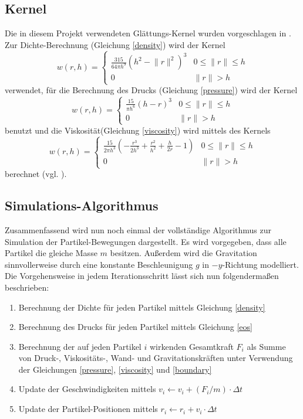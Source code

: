 \subsection*{Kernel}
Die in diesem Projekt verwendeten Glättungs-Kernel wurden vorgeschlagen in \cite{FluidSim}. Zur Dichte-Berechnung (Gleichung \ref{density}) wird der Kernel
\[
w(r,h) = \begin{cases}
\frac{315}{64\pi h^9} (h^2 - \lVert r \rVert^2)^3 & 0\leq \lVert r \rVert\leq h\\
0 & \lVert r \rVert > h
\end{cases}
\]
verwendet, für die Berechnung des Drucks (Gleichung \ref{pressure}) wird der Kernel
\[
w(r,h) = \begin{cases}
\frac{15}{\pi h^6} (h-r)^3 & 0\leq \lVert r \rVert\leq h\\
0 & \lVert r \rVert > h
\end{cases}
\]
benutzt und die Viskosität(Gleichung \ref{viscosity}) wird mittels des Kernels
\[
w(r,h) = \begin{cases}
\frac{15}{2\pi h^3} \left(-\frac{r^3}{2h^3} + \frac{r^2}{h^2} + \frac{h}{2r} - 1\right) & 0\leq \lVert r \rVert\leq h\\
0 & \lVert r \rVert > h
\end{cases}
\]
berechnet (vgl. \cite[S. 157]{FluidSim}).


\subsection*{Simulations-Algorithmus}
Zusammenfassend wird nun noch einmal der voll\-ständige Algorithmus zur Simulation der Partikel-Bewegungen dargestellt. Es wird vorgegeben, dass alle Partikel die gleiche Masse $m$ besitzen. Außerdem wird die Gravitation sinnvollerweise durch eine konstante Beschleunigung $g$ in $-y$-Richtung modelliert. Die Vorgehensweise in jedem Iterationsschritt lässt sich nun folgendermaßen beschrieben:
\begin{enumerate}
\item Berechnung der Dichte für jeden Partikel mittels Gleichung \ref{density}
\item Berechnung des Drucks für jeden Partikel mittels Gleichung \ref{eos}
\item Berechnung der auf jeden Partikel $i$ wirkenden Gesamtkraft $F_i$ als Summe von Druck-, Viskositäts-, Wand- und Gravitationskräften unter Verwendung der Gleichungen \ref{pressure}, \ref{viscosity} und \ref{boundary}
\item Update der Geschwindigkeiten mittels $v_i \leftarrow v_i + (F_i / m) \cdot \Delta t$
\item Update der Partikel-Positionen mittels $r_i \leftarrow r_i + v_i \cdot \Delta t$
\end{enumerate}







